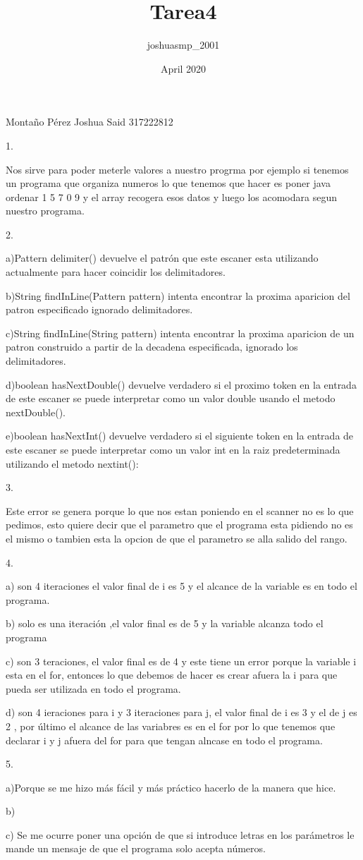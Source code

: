 \documentclass{article}
\title{Tarea4}
\author{joshuasmp_2001 }
\date{April 2020}
\begin{document}
Montaño Pérez Joshua Said 
317222812


1.


Nos sirve para poder meterle valores a nuestro progrma 
por ejemplo si tenemos un programa que organiza numeros lo que tenemos que hacer es poner java ordenar 1 5 7 0 9 y el array recogera esos datos y luego los acomodara segun nuestro programa.

2.


a)Pattern 
    delimiter()
    devuelve el patrón que este escaner esta utilizando actualmente para hacer coincidir los delimitadores.
    
    
b)String 
    findInLine(Pattern pattern)
    intenta encontrar la proxima aparicion del patron especificado ignorado delimitadores.
    
    
c)String 
    findInLine(String pattern)
    intenta encontrar la proxima aparicion de un patron construido a partir de la decadena especificada, ignorado los delimitadores.


d)boolean 
    hasNextDouble()
    devuelve verdadero si el proximo token en la entrada de este escaner se puede interpretar como un valor double usando el metodo nextDouble().
    
    
e)boolean 
    hasNextInt()
    devuelve verdadero si el siguiente token en la entrada de este escaner se puede interpretar como un valor int en la raiz predeterminada utilizando el metodo nextint():
    
    
3.

Este error se genera porque lo que nos estan poniendo en el scanner no es lo que pedimos, esto quiere decir que el parametro que el programa esta pidiendo no es el mismo o tambien esta la opcion de que el parametro se alla salido del rango.


4.

a) son 4 iteraciones 
el valor final de i es 5 y el alcance de la variable es en todo el programa. 


b) solo es una iteración ,el valor final es de 5 y  la variable alcanza todo el programa 

c) son 3 teraciones, el valor final es de 4 y este tiene un error porque la variable i esta en el for, entonces lo que debemos de hacer es crear afuera la i para que pueda ser utilizada en todo el programa. 


d) son 4 ieraciones para i y 3 iteraciones para j, el valor final de i es 3 y el de j es 2 , por último el alcance de las variabres es en el for por lo que tenemos que declarar i y j afuera del for  para que tengan alncase en todo el programa. 


5.


a)Porque se me hizo más fácil y más práctico hacerlo de la manera que hice. 


b) 

c) Se me ocurre poner una opción de que si introduce letras en los parámetros le mande un mensaje de que el programa solo acepta números. 
 
\end{document}
